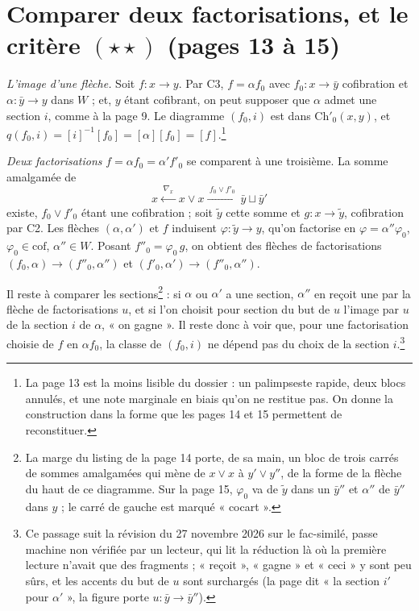 \documentclass[11pt,a4paper]{article}
\begin{document}
\section*{Comparer deux factorisations, et le critère $(\star\star)$ (pages 13 à 15)}

\emph{L'image d'une flèche.} Soit $f : x \to y$. Par C3, $f = \alpha f_{0}$ avec
$f_{0} : x \to \bar{y}$ cofibration et $\alpha : \bar{y} \to y$ dans $W$ ; et,
$y$ étant cofibrant, on peut supposer que $\alpha$ admet une section $i$,
comme à la page 9. Le diagramme $(f_{0}, i)$ est dans $\mathrm{Ch}'_{0}(x,y)$,
et $q(f_{0}, i) = [i]^{-1}[f_{0}] = [\alpha][f_{0}] = [f]$.\footnote{La page 13
est la moins lisible du dossier : un palimpseste rapide, deux blocs annulés,
et une note marginale en biais qu'on ne restitue pas. On donne la
construction dans la forme que les pages 14 et 15 permettent de reconstituer.}

\emph{Deux factorisations} $f = \alpha f_{0} = \alpha' f'_{0}$ se comparent à
une troisième. La somme amalgamée de
\[
x \xleftarrow{\;\nabla_{x}\;} x \vee x \xrightarrow{\;f_{0} \vee f'_{0}\;}
\bar{y} \sqcup \bar{y}'
\]
existe, $f_{0} \vee f'_{0}$ étant une cofibration ; soit $\widetilde{y}$ cette
somme et $g : x \to \widetilde{y}$, cofibration par C2. Les flèches $(\alpha,
\alpha')$ et $f$ induisent $\varphi : \widetilde{y} \to y$, qu'on factorise en
$\varphi = \alpha''\varphi_{0}$, $\varphi_{0} \in \mathrm{cof}$,
$\alpha'' \in W$. Posant $f''_{0} = \varphi_{0}\, g$, on obtient des flèches de
factorisations $(f_{0}, \alpha) \to (f''_{0}, \alpha'')$ et
$(f'_{0}, \alpha') \to (f''_{0}, \alpha'')$.


Il reste à comparer les sections\footnote{La marge du listing de la page 14
porte, de sa main, un bloc de trois carrés de sommes amalgamées qui mène de
$x \vee x$ à $y' \vee y''$, de la forme de la flèche du haut de ce
diagramme. Sur la page 15, $\varphi_{0}$ va de $\widetilde{y}$ dans un
$\bar{y}''$ et $\alpha''$ de $\bar{y}''$ dans $y$ ; le carré de gauche est
marqué « cocart ».} : si $\alpha$ ou $\alpha'$ a une section, $\alpha''$
en reçoit une par la flèche de factorisations $u$, et si l'on choisit pour
section du but de $u$ l'image par $u$ de la section $i$ de $\alpha$, « on
gagne ». Il reste donc à voir que, pour une factorisation choisie de $f$ en
$\alpha f_{0}$, la classe de $(f_{0}, i)$ ne dépend pas du choix de la section
$i$.\footnote{Ce passage suit la révision du 27 novembre 2026 sur le
fac-similé, passe machine non vérifiée par un lecteur, qui lit la réduction
là où la première lecture n'avait que des fragments ; « reçoit », « gagne »
et « ceci » y sont peu sûrs, et les accents du but de $u$ sont surchargés
(la page dit « la section $i'$ pour $\alpha'$ », la figure porte
$u : \bar{y} \to \bar{y}''$).}
\end{document}
